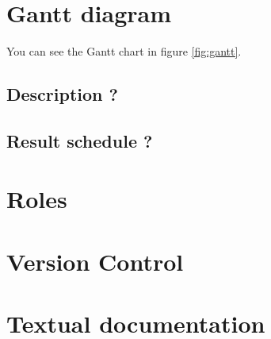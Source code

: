 \section{Gantt diagram}
You can see the Gantt chart in figure \ref{fig:gantt}.

\subsection{Description ?}
\subsection{Result schedule ?}
\section{Roles}
\section{Version Control}
\section{Textual documentation}

